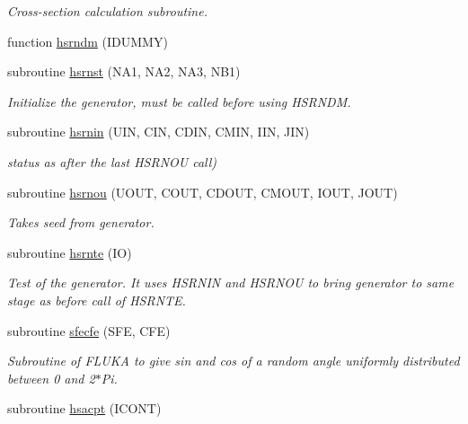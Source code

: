 \begin{DoxyCompactItemize}
\begin{DoxyCompactList}\small\item\em Cross-\/section calculation subroutine. \end{DoxyCompactList}\item 
function \hyperlink{djangoh__h_8f_a895b8de31614861bceb4dbcfb33bee8e}{hsrndm} (I\+D\+U\+M\+MY)
\item 
subroutine \hyperlink{djangoh__h_8f_a54e057d1ece2367e4e29d6b22165af73}{hsrnst} (N\+A1, N\+A2, N\+A3, N\+B1)
\begin{DoxyCompactList}\small\item\em Initialize the generator, must be called before using H\+S\+R\+N\+DM. \end{DoxyCompactList}\item 
subroutine \hyperlink{djangoh__h_8f_aee80afbe7295985ce737632fea55347a}{hsrnin} (U\+IN, C\+IN, C\+D\+IN, C\+M\+IN, I\+IN, J\+IN)
\begin{DoxyCompactList}\small\item\em status as after the last H\+S\+R\+N\+OU call) \end{DoxyCompactList}\item 
subroutine \hyperlink{djangoh__h_8f_a0c8e4208bf8844ec9fe1475008626308}{hsrnou} (U\+O\+UT, C\+O\+UT, C\+D\+O\+UT, C\+M\+O\+UT, I\+O\+UT, J\+O\+UT)
\begin{DoxyCompactList}\small\item\em Takes seed from generator. \end{DoxyCompactList}\item 
subroutine \hyperlink{djangoh__h_8f_ad8ebc1d3ae04868815774ec2eda89a8a}{hsrnte} (IO)
\begin{DoxyCompactList}\small\item\em Test of the generator. It uses H\+S\+R\+N\+IN and H\+S\+R\+N\+OU to bring generator to same stage as before call of H\+S\+R\+N\+TE. \end{DoxyCompactList}\item 
subroutine \hyperlink{djangoh__h_8f_a5a653b32b78fa07a92fcdd6c69c0f68d}{sfecfe} (S\+FE, C\+FE)
\begin{DoxyCompactList}\small\item\em Subroutine of F\+L\+U\+KA to give sin and cos of a random angle uniformly distributed between 0 and 2$\ast$\+Pi. \end{DoxyCompactList}\item 
subroutine \hyperlink{djangoh__h_8f_a55436ff7e1bd788550629bf01295b2ca}{hsacpt} (I\+C\+O\+NT)
\item 

\end{DoxyCompactItemize}
